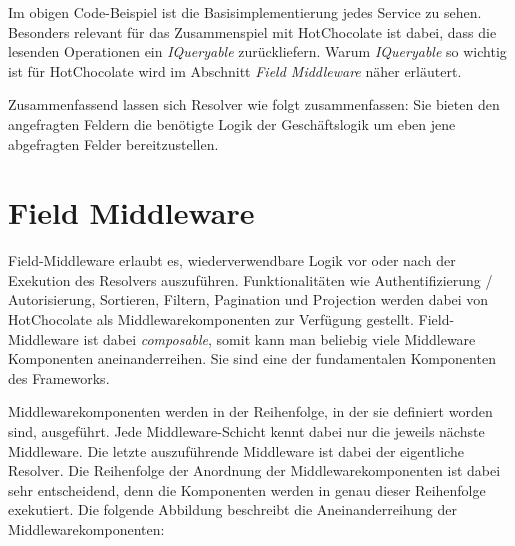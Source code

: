Im obigen Code-Beispiel ist die Basisimplementierung jedes Service zu sehen.
Besonders relevant für das Zusammenspiel mit HotChocolate ist dabei, dass die lesenden Operationen ein \textit{IQueryable} zurückliefern.
Warum \textit{IQueryable} so wichtig ist für HotChocolate wird im Abschnitt \textit{Field Middleware} näher erläutert.
\newline

Zusammenfassend lassen sich Resolver wie folgt zusammenfassen: Sie bieten den angefragten Feldern die benötigte Logik der Geschäftslogik um eben jene abgefragten Felder bereitzustellen.

\section{Field Middleware}
Field-Middleware erlaubt es, wiederverwendbare Logik vor oder nach der Exekution des Resolvers auszuführen.
Funktionalitäten wie Authentifizierung / Autorisierung, Sortieren, Filtern, Pagination und Projection werden dabei von HotChocolate als Middlewarekomponenten zur Verfügung gestellt. 
Field-Middleware ist dabei \textit{composable}, somit kann man beliebig viele Middleware Komponenten aneinanderreihen.
Sie sind eine der fundamentalen Komponenten des Frameworks.


Middlewarekomponenten werden in der Reihenfolge, in der sie definiert worden sind, ausgeführt.
Jede Middleware-Schicht kennt dabei nur die jeweils nächste Middleware.
Die letzte auszuführende Middleware ist dabei der eigentliche Resolver.
Die Reihenfolge der Anordnung der Middlewarekomponenten ist dabei sehr entscheidend, denn die Komponenten werden in genau dieser Reihenfolge exekutiert.
Die folgende Abbildung beschreibt die Aneinanderreihung der Middlewarekomponenten:

